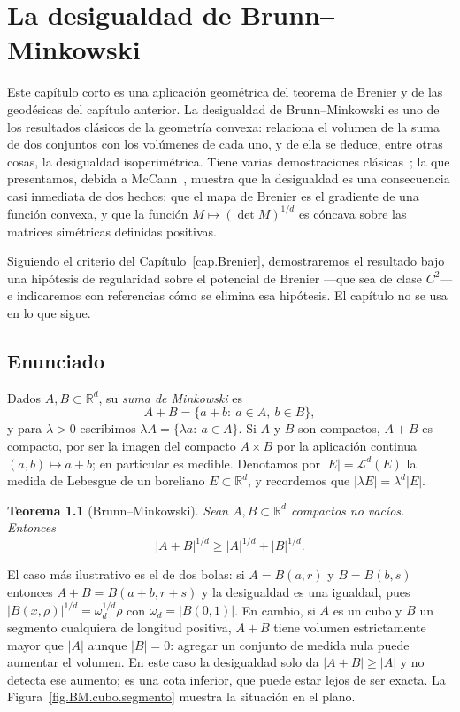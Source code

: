 \documentclass[12pt, a4paper]{amsbook}
\newcommand{\R}{{\mathbb R}}
\newtheorem{teo}{Teorema}[section]
\theoremstyle{remark}
\theoremstyle{definition}
\numberwithin{section}{chapter}
\numberwithin{subsection}{section}
\numberwithin{equation}{section}
\numberwithin{figure}{chapter}
\begin{document}
\chapter{La desigualdad de Brunn--Minkowski}\label{cap.BM}

Este capítulo corto es una aplicación geométrica del teorema de Brenier y de
las geodésicas del capítulo anterior. La desigualdad de Brunn--Minkowski es
uno de los resultados clásicos de la geometría convexa: relaciona el volumen
de la suma de dos conjuntos con los volúmenes de cada uno, y de ella se
deduce, entre otras cosas, la desigualdad isoperimétrica. Tiene varias
demostraciones clásicas~\cite{Gardner2002}; la que presentamos, debida a
McCann~\cite{McCann1997}, muestra que la desigualdad es una consecuencia casi
inmediata de dos hechos: que el mapa de Brenier es el gradiente de una
función convexa, y que la función $M\mapsto(\det M)^{1/d}$ es cóncava sobre las
matrices simétricas definidas positivas.

Siguiendo el criterio del Capítulo~\ref{cap.Brenier}, demostraremos el
resultado bajo una hipótesis de regularidad sobre el potencial de Brenier —que
sea de clase $C^2$— e indicaremos con referencias cómo se elimina esa
hipótesis. El capítulo no se usa en lo que sigue.

\section{Enunciado}\label{sec.BM.enunciado}

Dados $A,B\subset\R^d$, su \emph{suma de Minkowski} es
\[
A+B=\{a+b:\ a\in A,\ b\in B\},
\]
y para $\lambda>0$ escribimos $\lambda A=\{\lambda a:\ a\in A\}$. Si $A$ y $B$
son compactos, $A+B$ es compacto, por ser la imagen del compacto $A\times B$
por la aplicación continua $(a,b)\mapsto a+b$; en particular es medible.
Denotamos por $|E|=\mathcal L^d(E)$ la medida de Lebesgue de un boreliano
$E\subset\R^d$, y recordemos que $|\lambda E|=\lambda^d|E|$.

\begin{teo}[Brunn--Minkowski]\label{teo.BM}
Sean $A,B\subset\R^d$ compactos no vacíos. Entonces
\[
|A+B|^{1/d}\ge|A|^{1/d}+|B|^{1/d}.
\]
\end{teo}

El caso más ilustrativo es el de dos bolas: si $A=B(a,r)$ y $B=B(b,s)$
entonces $A+B=B(a+b,r+s)$ y la desigualdad es una igualdad, pues
$|B(x,\rho)|^{1/d}=\omega_d^{1/d}\rho$ con $\omega_d=|B(0,1)|$. En cambio, si
$A$ es un cubo y $B$ un segmento cualquiera de longitud positiva,
$A+B$ tiene volumen estrictamente mayor que $|A|$ aunque $|B|=0$: agregar un
conjunto de medida nula puede aumentar el volumen. En este caso la
desigualdad solo da $|A+B|\ge|A|$ y no detecta ese aumento; es una cota
inferior, que puede estar lejos de ser exacta. La
Figura~\ref{fig.BM.cubo.segmento} muestra la situación en el plano.
\end{document}
